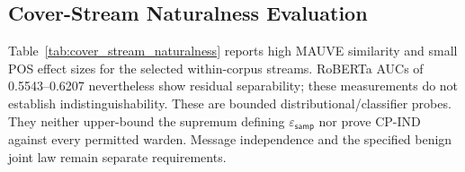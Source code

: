 \documentclass[pdflatex,sn-mathphys-num]{sn-jnl}%
\renewcommand{\arraystretch}{1.2}
\renewcommand{\arraystretch}{1.0}
\theoremstyle{definition}
\theoremstyle{game}
\theoremstyle{thmstyleone}%
\theoremstyle{thmstyletwo}%
\theoremstyle{thmstylethree}%
\begin{document}
\subsection{Cover-Stream Naturalness Evaluation}
\label{subsec:cover_stream_naturalness}

\begin{table}[!t]
\centering
\caption{Within-corpus cover-stream naturalness evaluation. Higher MAUVE indicates stronger distributional similarity to held-out benign text, while lower RoBERTa accuracy/AUC and lower POS Cramér's $V$ indicate weaker separability from benign text. Results are reported as mean~$\pm$~standard deviation across three random splits and two keyed cover streams.}
\label{tab:cover_stream_naturalness}

\setlength{\tabcolsep}{3.5pt}
\renewcommand{\arraystretch}{1.0}


\end{table}


Table~\ref{tab:cover_stream_naturalness} reports high MAUVE similarity
and small POS effect sizes for the selected within-corpus streams.
RoBERTa AUCs of 0.5543--0.6207 nevertheless show residual separability;
these measurements do not establish indistinguishability. These are
bounded distributional/classifier probes.
They neither upper-bound the supremum defining $\varepsilon_{\mathsf{samp}}$
nor prove CP-IND against every permitted warden. Message independence and
the specified benign joint law remain separate requirements.
\end{document}
